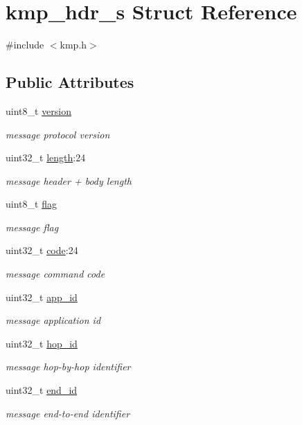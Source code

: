 \hypertarget{structkmp__hdr__s}{\section{kmp\-\_\-hdr\-\_\-s Struct Reference}
\label{structkmp__hdr__s}
}


{\ttfamily \#include $<$kmp.\-h$>$}

\subsection*{Public Attributes}
\begin{DoxyCompactItemize}
\item 
uint8\-\_\-t \hyperlink{structkmp__hdr__s_a776ad75facaebe9caa19d9d08295d2a9}{version}
\begin{DoxyCompactList}\small\item\em message protocol version \end{DoxyCompactList}\item 
uint32\-\_\-t \hyperlink{structkmp__hdr__s_a2c434e6d127228ecf717e5a89ceb385f}{length}\-:24
\begin{DoxyCompactList}\small\item\em message header + body length \end{DoxyCompactList}\item 
uint8\-\_\-t \hyperlink{structkmp__hdr__s_a9fb7d6b15240a2819ecf1bb5f8a9188f}{flag}
\begin{DoxyCompactList}\small\item\em message flag \end{DoxyCompactList}\item 
uint32\-\_\-t \hyperlink{structkmp__hdr__s_a02a4618b60f6e9f6be45c18bc1b99503}{code}\-:24
\begin{DoxyCompactList}\small\item\em message command code \end{DoxyCompactList}\item 
uint32\-\_\-t \hyperlink{structkmp__hdr__s_a3aa529d8b4693f2ae937ce94ac0bf560}{app\-\_\-id}
\begin{DoxyCompactList}\small\item\em message application id \end{DoxyCompactList}\item 
uint32\-\_\-t \hyperlink{structkmp__hdr__s_a0b3186d9e096e3e599a0a96329ccc091}{hop\-\_\-id}
\begin{DoxyCompactList}\small\item\em message hop-\/by-\/hop identifier \end{DoxyCompactList}\item 
uint32\-\_\-t \hyperlink{structkmp__hdr__s_a58745a4198eb8e139e3597b2f71ef5ab}{end\-\_\-id}
\begin{DoxyCompactList}\small\item\em message end-\/to-\/end identifier \end{DoxyCompactList}\end{DoxyCompactItemize}


